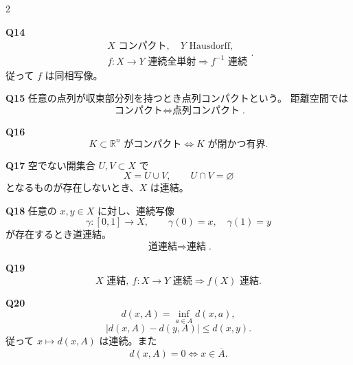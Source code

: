 \documentclass[uplatex,dvipdfmx,9pt]{jsarticle}
\newcommand{\R}{\mathbb R}
\newcommand{\abs}[1]{\lvert#1\rvert}
\newcommand{\answer}[2]{%
  \par\noindent
  {\color{teal}\bfseries Q#1}\quad #2\par
  \vspace{1.5mm}
}
\newcommand{\must}[1]{\boxed{\displaystyle #1}}
\begin{document}
\begin{multicols}{2}
\answer{14}{
\[
\boxed{\begin{gathered}
X\text{ コンパクト},\quad Y\text{ Hausdorff},\\
f:X\to Y\text{ 連続全単射}
\Longrightarrow f^{-1}\text{ 連続}
\end{gathered}}.
\]
従って \(f\) は同相写像。}

\answer{15}{
任意の点列が収束部分列を持つとき点列コンパクトという。
距離空間では
\[
\must{\text{コンパクト}\iff\text{点列コンパクト}}.
\]}

\answer{16}{
\[
\must{
K\subset\R^n\text{ がコンパクト}
\iff K\text{ が閉かつ有界}}.
\]}

\answer{17}{
空でない開集合 \(U,V\subset X\) で
\[
X=U\cup V,\qquad U\cap V=\varnothing
\]
となるものが存在しないとき、\(X\) は連結。}

\answer{18}{
任意の \(x,y\in X\) に対し、連続写像
\[
\gamma:[0,1]\to X,\qquad
\gamma(0)=x,\quad\gamma(1)=y
\]
が存在するとき道連結。
\[
\must{\text{道連結}\Longrightarrow\text{連結}}.
\]}

\answer{19}{
\[
\must{X\text{ 連結},\ f:X\to Y\text{ 連続}
\Longrightarrow f(X)\text{ 連結}}.
\]}

\answer{20}{
\[
d(x,A)=\inf_{a\in A}d(x,a),
\]
\[
\must{\abs{d(x,A)-d(y,A)}\le d(x,y)}.
\]
従って \(x\mapsto d(x,A)\) は連続。また
\[
\must{d(x,A)=0\iff x\in\overline A}.
\]}
\end{multicols}
\end{document}
